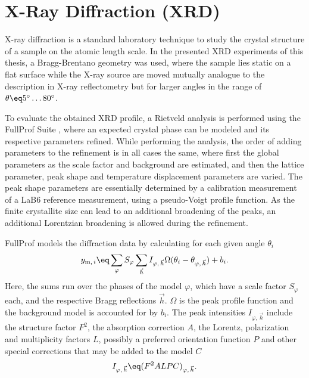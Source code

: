 \documentclass[\main/dresen_thesis.tex]{subfiles}
\begin{document}
  \section{X-Ray Diffraction (XRD)}
    \label{ch:methods:xrd}
    X-ray diffraction is a standard laboratory technique to study the crystal structure of a sample on the atomic length scale.
    In the presented XRD experiments of this thesis, a Bragg-Brentano geometry was used, where the sample lies static on a flat surface while the X-ray source are moved mutually analogue to the description in X-ray reflectometry but for larger angles in the range of $\theta \eq 5^\circ \ldots 80^\circ$.

    To evaluate the obtained XRD profile, a Rietveld analysis is performed using the FullProf Suite \cite{Rodriguez_1993_Recen}, where an expected crystal phase can be modeled and its respective parameters refined.
    While performing the analysis, the order of adding parameters to the refinement is in all cases the same, where first the global parameters as the scale factor and background are estimated, and then the lattice parameter, peak shape and temperature displacement parameters are varied.
    The peak shape parameters are essentially determined by a calibration measurement of a LaB6 reference measurement, using a pseudo-Voigt profile function.
    As the finite crystallite size can lead to an additional broadening of the peaks, an additional Lorentzian broadening is allowed during the refinement.

    FullProf models the diffraction data by calculating for each given angle $\theta_i$
    \begin{align}
      y_{\mathrm{m}, \, i} \eq
        \sum_{\varphi} S_{\varphi}
        \sum_{\vec{h}}
          I_{\varphi, \, \vec{h}}
          \Omega ( \theta_{i} - \theta_{\varphi, \, \vec{h}})
        + b_i.
    \end{align}
    Here, the sums run over the phases of the model $\varphi$, which have a scale factor $S_{\varphi}$ each, and the respective Bragg reflections $\vec{h}$.
    $\Omega$ is the peak profile function and the background model is accounted for by $b_i$.
    The peak intensities $I_{\varphi, \, \vec{h}}$ include the structure factor $F^2$, the absorption correction $A$, the Lorentz, polarization and multiplicity factors $L$, possibly a preferred orientation function $P$ and other special corrections that may be added to the model $C$
    \begin{align}
      I_{\varphi, \, \vec{h}} \eq (F^2 A L P C)_{\varphi, \, \vec{h}}.
    \end{align}
\end{document}
